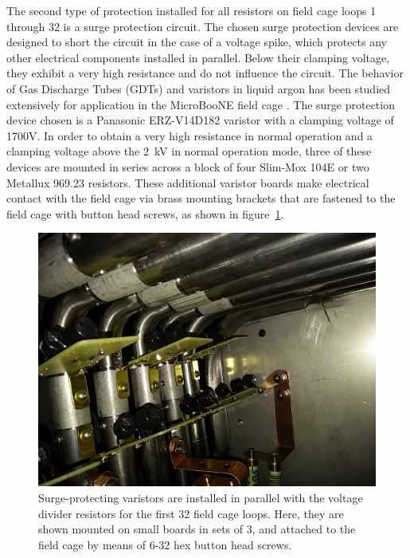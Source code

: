 The second type of protection installed for all resistors on field cage loops 1 through 32 is a surge protection circuit. The chosen surge protection devices are designed to short the circuit in the case of a voltage spike, which protects any other electrical components installed in parallel.  Below their clamping voltage, they exhibit a very high resistance and do not influence the circuit. The behavior of Gas Discharge Tubes (GDTs) and varistors in liquid argon has been studied extensively for application in the MicroBooNE field cage \cite{Asaadi:2014iva}. The surge protection device chosen is a Panasonic ERZ-V14D182 varistor with a clamping voltage of 1700V. In order to obtain a very high resistance in normal operation and a clamping voltage above the 2~kV in normal operation mode, three of these devices are mounted in series across a block of four Slim-Mox 104E or two Metallux 969.23 resistors. These additional varistor boards make electrical contact with the field cage via brass mounting brackets that are fastened to the field cage with button head screws, as shown in figure~\ref{fig:tpc-voltage-divider-varistors}.

\begin{figure}[htb]
\centering	
\includegraphics[width=0.8\linewidth]{figures/tpc-voltage-divider-varistors.jpg}
\caption{Surge-protecting varistors are installed in parallel with the voltage divider resistors for the first 32 field cage loops. Here, they are shown mounted on small boards in sets of 3, and attached to the field cage by means of 6-32 hex button head screws.}
\label{fig:tpc-voltage-divider-varistors}
\end{figure}





